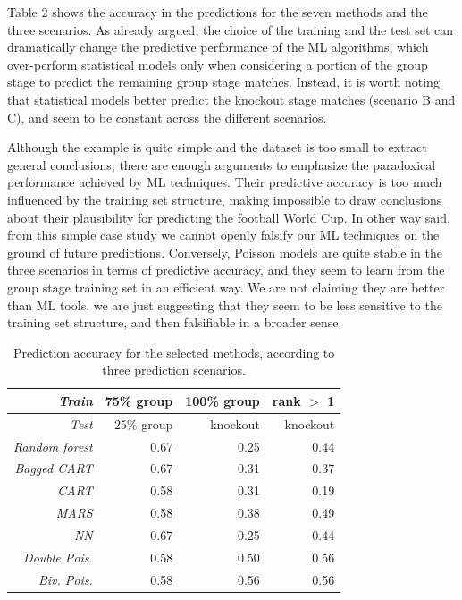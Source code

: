 \documentclass{statsoc}
\begin{document}
Table 2 shows the accuracy in the predictions for the seven methods and the three  scenarios.  As already argued, the choice of the training and the test set can dramatically 
change the predictive performance of the ML algorithms, which over-perform statistical models only when considering a portion of the group stage to predict the remaining 
group stage matches. Instead, it is worth noting that statistical models better predict the knockout stage matches (scenario B and C), and seem to be constant across the different scenarios.

Although the example is quite simple and the dataset is too small to extract general conclusions, there are enough arguments to emphasize the paradoxical performance achieved by ML techniques. Their predictive accuracy is too much influenced by the training set 
structure, making impossible to draw conclusions about their plausibility for predicting the football World Cup. In other way said, from this simple case study we cannot openly 
falsify our ML techniques on the ground of future predictions. Conversely, Poisson models are quite stable in the three scenarios in terms of predictive accuracy, and they 
seem to learn from the group stage training set in an efficient way. We are not claiming they are better than ML tools, we are just suggesting that they seem to be less sensitive to the training set structure, and then falsifiable in a broader sense.

\begin{center}
\begin{table}
\caption{Prediction accuracy for the selected methods, according to three prediction  scenarios.}
\begin{tabular}{|r|rrr|}
\hline 
 \emph{Train}& 75\% group  & 100\% group  & rank $>$ 1   \\ 
  \hline
\emph{Test} & 25\% group & knockout & knockout\\ 
  \hline
\emph{Random forest} & 0.67 & 0.25 & 0.44 \\ 
  \emph{Bagged CART} & 0.67 & 0.31 & 0.37  \\ 
  \emph{CART} & 0.58 & 0.31 & 0.19  \\ 
  \emph{MARS} & 0.58 & 0.38 & 0.49 \\ 
  \emph{NN} & 0.67 & 0.25 & 0.44  \\ 
  \emph{Double Pois.} & 0.58 & 0.50 & 0.56  \\ 
  \emph{Biv. Pois.} & 0.58 & 0.56 & 0.56  \\ 
   \hline
\end{tabular}
\end{table}
\end{center}
%
\end{document}
